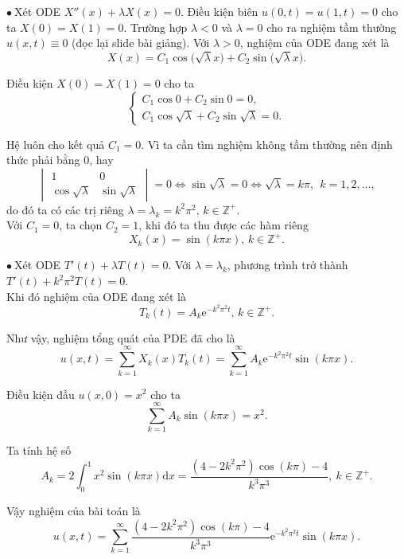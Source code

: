 \documentclass[10pt, a4paper]{article}
\begin{document}
	$\bullet~$Xét ODE $X''(x)+\lambda X(x)=0$. Điều kiện biên $u(0,t)=u(1,t)=0$ cho ta $X(0)=X(1)=0$. Trường hợp $\lambda<0$ và $\lambda=0$ cho ra nghiệm tầm thường $u(x,t)\equiv0$ (đọc lại slide bài giảng). Với $\lambda>0$, nghiệm của ODE đang xét là $$X(x)=C_1\cos\big(\sqrt\lambda x\big)+C_2\sin\big(\sqrt\lambda x\big).$$
	
	Điều kiện $X(0)=X(1)=0$ cho ta $$\begin{cases}
		C_1\cos0+C_2\sin0=0,\\
		C_1\cos\sqrt\lambda+C_2\sin\sqrt\lambda=0.
	\end{cases}$$
	
	Hệ luôn cho kết quả $C_1=0$. Vì ta cần tìm nghiệm không tầm thường nên định thức phải bằng 0, hay $$\begin{vmatrix}
		1&0\\
		\cos\sqrt\lambda&\sin\sqrt\lambda
	\end{vmatrix}=0\iff\sin\sqrt\lambda=0\iff\sqrt\lambda=k\pi,~~k=1,2,\ldots,$$
	do đó ta có các trị riêng $\lambda=\lambda_k=k^2\pi^2,\,k\in\mathbb Z^+$.\\
	
	Với $C_1=0$, ta chọn $C_2=1$, khi đó ta thu được các hàm riêng $$X_k(x)=\sin(k\pi x),\,k\in\mathbb Z^+.$$
	
	$\bullet~$Xét ODE $T'(t)+\lambda T(t)=0$. Với $\lambda=\lambda_k$, phương trình trở thành $T'(t)+k^2\pi^2T(t)=0$.\\
	
	Khi đó nghiệm của ODE đang xét là $$T_k(t)=A_k\mathrm e^{-k^2\pi^2t},\,k\in\mathbb Z^+.$$
	
	Như vậy, nghiệm tổng quát của PDE đã cho là $$u(x,t)=\sum_{k=1}^\infty X_k(x)T_k(t)=\sum_{k=1}^\infty A_k\mathrm e^{-k^2\pi^2t}\sin(k\pi x).$$
	
	Điều kiện đầu $u(x,0)=x^2$ cho ta $$\sum_{k=1}^\infty A_k\sin(k\pi x)=x^2.$$
	
	Ta tính hệ số $$A_k=2\int_0^1x^2\sin(k\pi x)\mathrm dx=\frac{(4-2k^2\pi^2)\cos(k\pi)-4}{k^3\pi^3},~k\in\mathbb Z^+.$$
	
	Vậy nghiệm của bài toán là $$u(x,t)=\sum_{k=1}^\infty\frac{(4-2k^2\pi^2)\cos(k\pi)-4}{k^3\pi^3}\mathrm e^{-k^2\pi^2t}\sin(k\pi x).$$
	\vspace{1mm}
\end{document}
